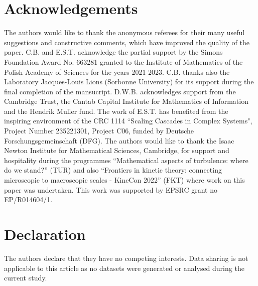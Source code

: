 \documentclass[12pt,a4paper]{article}
\theoremstyle{definition}
\theoremstyle{remark}
\numberwithin{equation}{section}
\begin{document}
\section*{Acknowledgements}
The authors would like to thank the anonymous referees for their many useful suggestions and constructive comments, which have improved the quality of the paper. C.B. and E.S.T. acknowledge the partial support by the Simons Foundation Award No. 663281 granted to the Institute of Mathematics of the Polish Academy of Sciences for the years 2021-2023. C.B. thanks also the Laboratory Jacques-Louis Lions (Sorbonne University) for its support during the final completion of the mansucript. D.W.B. acknowledges support from the Cambridge Trust, the Cantab Capital Institute for Mathematics of Information and the Hendrik Muller fund. The work of E.S.T. has benefited from the inspiring environment of the CRC 1114 ``Scaling Cascades in Complex Systems", Project Number 235221301, Project C06, funded by Deutsche Forschungsgemeinschaft (DFG). The authors would like to thank the Isaac Newton Institute for Mathematical Sciences, Cambridge, for support and hospitality during the programmes ``Mathematical aspects of turbulence: where do we stand?'' (TUR) and also ``Frontiers in kinetic theory: connecting microscopic to macroscopic scales - KineCon 2022'' (FKT) where work on this paper was undertaken. This work was supported by EPSRC grant no EP/R014604/1.

\section*{Declaration}
The authors declare that they have no competing interests. Data sharing is not applicable to this article as no datasets were generated or analysed during the current study.
\end{document}

